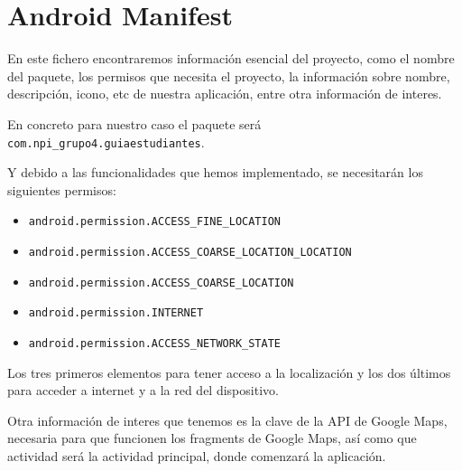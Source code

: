 
\section{Android Manifest}

En este fichero encontraremos información esencial del proyecto, como el nombre del paquete, los permisos que necesita el proyecto, la información sobre nombre, descripción, icono, etc de nuestra aplicación, entre otra información de interes.

En concreto para nuestro caso el paquete será \texttt{com.npi\_grupo4.guiaestudiantes}.

Y debido a las funcionalidades que hemos implementado, se necesitarán los siguientes permisos:

\begin{itemize}

	\item \texttt{android.permission.ACCESS\_FINE\_LOCATION}
	\item \texttt{android.permission.ACCESS\_COARSE\_LOCATION\_LOCATION}
	\item \texttt{android.permission.ACCESS\_COARSE\_LOCATION}
	\item \texttt{android.permission.INTERNET}
	\item \texttt{android.permission.ACCESS\_NETWORK\_STATE}

\end{itemize}

Los tres primeros elementos para tener acceso a la localización y los dos últimos para acceder a internet y a la red del dispositivo.

Otra información de interes que tenemos es la clave de la API de Google Maps, necesaria para que funcionen los fragments de Google Maps, así como que actividad será la actividad principal, donde comenzará la aplicación.


